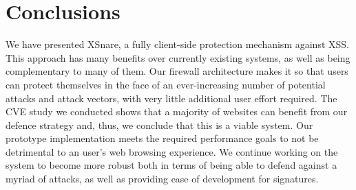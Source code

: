 \section{Conclusions}
We have presented XSnare, a fully client-side protection mechanism against XSS. This approach has many benefits over currently existing systems, as well as being complementary to many of them. Our firewall architecture makes it so that users can protect themselves in the face of an ever-increasing number of potential attacks and attack vectors, with very little additional user effort required. The CVE study we conducted shows that a majority of websites can benefit from our defence strategy and, thus, we conclude that this is a viable system. Our prototype implementation meets the required performance goals to not be detrimental to an user's web browsing experience. We continue working on the system to become more robust both in terms of being able to defend against a myriad of attacks, as well as providing ease of development for signatures. 
